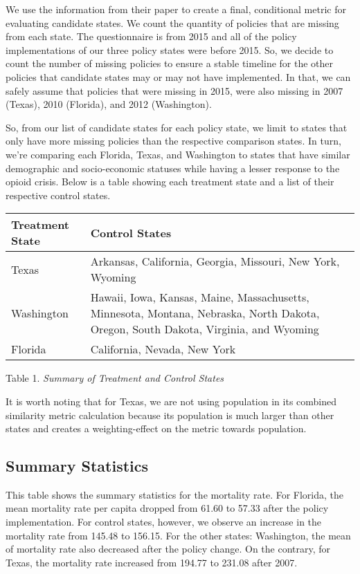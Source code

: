 \documentclass{article}
\begin{document}
We use the information from their paper to create a final, conditional
metric for evaluating candidate states. We count the quantity of
policies that are missing from each state. The questionnaire is from
2015 and all of the policy implementations of our three policy states
were before 2015. So, we decide to count the number of missing policies
to ensure a stable timeline for the other policies that candidate states
may or may not have implemented. In that, we can safely assume that
policies that were missing in 2015, were also missing in 2007 (Texas),
2010 (Florida), and 2012 (Washington).

So, from our list of candidate states for each policy state, we limit to
states that only have more missing policies than the respective
comparison states. In turn, we're comparing each Florida, Texas, and
Washington to states that have similar demographic and socio-economic
statuses while having a lesser response to the opioid crisis. Below is a
table showing each treatment state and a list of their respective
control states.

\begin{longtable}[]{@{}ll@{}}
\toprule
\textbf{Treatment State} & \textbf{Control States}\tabularnewline
\midrule
\endhead
Texas & Arkansas, California, Georgia, Missouri, New York,
Wyoming\tabularnewline
Washington & Hawaii, Iowa, Kansas, Maine, Massachusetts, Minnesota,
Montana, Nebraska, North Dakota, Oregon, South Dakota, Virginia, and
Wyoming\tabularnewline
Florida & California, Nevada, New York\tabularnewline
\bottomrule
\end{longtable}

Table 1. \emph{Summary of Treatment and Control States}

It is worth noting that for Texas, we are not using population in its
combined similarity metric calculation because its population is much
larger than other states and creates a weighting-effect on the metric
towards population.

\hypertarget{summary-statistics}{%
\subsection{Summary Statistics}\label{summary-statistics}}

This table shows the summary statistics for the mortality rate. For
Florida, the mean mortality rate per capita dropped from 61.60 to 57.33
after the policy implementation. For control states, however, we observe
an increase in the mortality rate from 145.48 to 156.15. For the other
states: Washington, the mean of mortality rate also decreased after the
policy change. On the contrary, for Texas, the mortality rate increased
from 194.77 to 231.08 after 2007.
\end{document}
